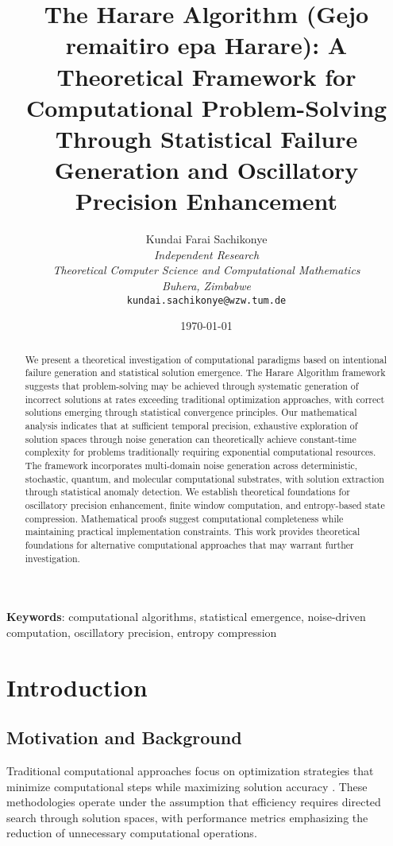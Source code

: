 \documentclass[11pt,a4paper]{article}
\title{The Harare Algorithm (Gejo remaitiro epa Harare): A Theoretical Framework for Computational Problem-Solving Through Statistical Failure Generation and Oscillatory Precision Enhancement}
\author{
Kundai Farai Sachikonye\\
\textit{Independent Research}\\
\textit{Theoretical Computer Science and Computational Mathematics}\\
\textit{Buhera, Zimbabwe}\\
\texttt{kundai.sachikonye@wzw.tum.de}
}
\date{\today}
\theoremstyle{remark}
\begin{document}
\maketitle

\begin{abstract}
We present a theoretical investigation of computational paradigms based on intentional failure generation and statistical solution emergence. The Harare Algorithm framework suggests that problem-solving may be achieved through systematic generation of incorrect solutions at rates exceeding traditional optimization approaches, with correct solutions emerging through statistical convergence principles. Our mathematical analysis indicates that at sufficient temporal precision, exhaustive exploration of solution spaces through noise generation can theoretically achieve constant-time complexity for problems traditionally requiring exponential computational resources. The framework incorporates multi-domain noise generation across deterministic, stochastic, quantum, and molecular computational substrates, with solution extraction through statistical anomaly detection. We establish theoretical foundations for oscillatory precision enhancement, finite window computation, and entropy-based state compression. Mathematical proofs suggest computational completeness while maintaining practical implementation constraints. This work provides theoretical foundations for alternative computational approaches that may warrant further investigation.
\end{abstract}

\textbf{Keywords}: computational algorithms, statistical emergence, noise-driven computation, oscillatory precision, entropy compression

\section{Introduction}

\subsection{Motivation and Background}

Traditional computational approaches focus on optimization strategies that minimize computational steps while maximizing solution accuracy \cite{cormen2009introduction,sipser2012introduction}. These methodologies operate under the assumption that efficiency requires directed search through solution spaces, with performance metrics emphasizing the reduction of unnecessary computational operations.
\end{document}
